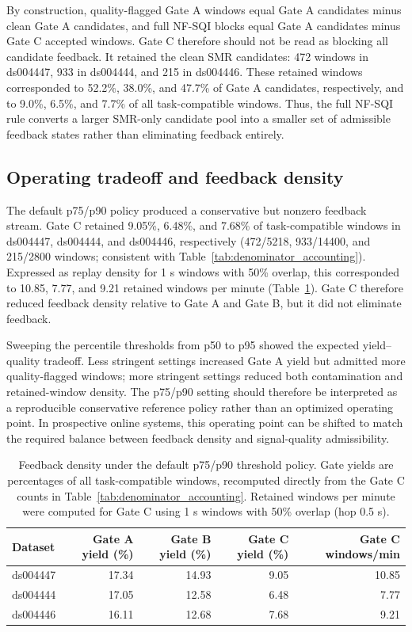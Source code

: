 \documentclass[preprint,12pt]{elsarticle}
\begin{document}
By construction, quality-flagged Gate A windows equal Gate A candidates minus clean Gate A candidates, and full NF-SQI blocks equal Gate A candidates minus Gate C accepted windows. Gate C therefore should not be read as blocking all candidate feedback. It retained the clean SMR candidates: 472 windows in ds004447, 933 in ds004444, and 215 in ds004446. These retained windows corresponded to 52.2\%, 38.0\%, and 47.7\% of Gate A candidates, respectively, and to 9.0\%, 6.5\%, and 7.7\% of all task-compatible windows. Thus, the full NF-SQI rule converts a larger SMR-only candidate pool into a smaller set of admissible feedback states rather than eliminating feedback entirely.

\subsection{Operating tradeoff and feedback density}

The default p75/p90 policy produced a conservative but nonzero feedback stream. Gate C retained 9.05\%, 6.48\%, and 7.68\% of task-compatible windows in ds004447, ds004444, and ds004446, respectively (472/5218, 933/14400, and 215/2800 windows; consistent with Table~\ref{tab:denominator_accounting}). Expressed as replay density for 1 s windows with 50\% overlap, this corresponded to 10.85, 7.77, and 9.21 retained windows per minute (Table~\ref{tab:feedback_density}). Gate C therefore reduced feedback density relative to Gate A and Gate B, but it did not eliminate feedback.

Sweeping the percentile thresholds from p50 to p95 showed the expected yield--quality tradeoff. Less stringent settings increased Gate A yield but admitted more quality-flagged windows; more stringent settings reduced both contamination and retained-window density. The p75/p90 setting should therefore be interpreted as a reproducible conservative reference policy rather than an optimized operating point. In prospective online systems, this operating point can be shifted to match the required balance between feedback density and signal-quality admissibility.

\begin{table}[htbp]
\centering
\small
\caption{Feedback density under the default p75/p90 threshold policy. Gate yields are percentages of all task-compatible windows, recomputed directly from the Gate C counts in Table~\ref{tab:denominator_accounting}. Retained windows per minute were computed for Gate C using 1 s windows with 50\% overlap (hop 0.5 s).}
\label{tab:feedback_density}
\begin{tabular}{lrrrr}
\toprule
Dataset & Gate A yield (\%) & Gate B yield (\%) & Gate C yield (\%) & Gate C windows/min \\
\midrule
ds004447 & 17.34 & 14.93 & 9.05 & 10.85 \\
ds004444 & 17.05 & 12.58 & 6.48 & 7.77 \\
ds004446 & 16.11 & 12.68 & 7.68 & 9.21 \\
\bottomrule
\end{tabular}
\end{table}
\end{document}
